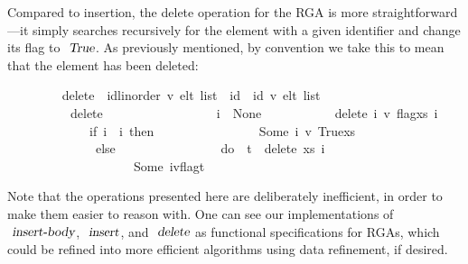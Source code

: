 \documentclass[acmlarge,review,anonymous]{acmart}\settopmatter{printfolios=true}
\begin{document}
Compared to insertion, the delete operation for the RGA is more straightforward---it simply searches recursively for the element with a given identifier and change its flag to $\isa{True}$.
As previously mentioned, by convention we take this to mean that the element has been deleted:
\\
\begin{isabellebody}
\ \ \ \ \ \ \ \  delete\ {\isacharcolon}{\isacharcolon}\ {\isachardoublequoteopen}{\isacharparenleft}{\isacharprime}id{\isacharcolon}{\isacharcolon}{\isacharbraceleft}linorder{\isacharbraceright}{\isacharcomma}\ {\isacharprime}v{\isacharparenright}\ elt\ list\ {\isasymRightarrow}\ {\isacharprime}id\ {\isasymrightharpoonup}\ {\isacharparenleft}{\isacharprime}id{\isacharcomma}\ {\isacharprime}v{\isacharparenright}\ elt\ list{\isachardoublequoteclose}\ \isanewline
\ \ \ \ \ \ \ \ \ \ {\isachardoublequoteopen}delete\ {\isacharbrackleft}{\isacharbrackright}\ \ \ \ \ \ \ \ \ \ \ \ \ \ \ \ \ i\ {\isacharequal}\ None{\isachardoublequoteclose}\ {\isacharbar}\isanewline
\ \ \ \ \ \ \ \ \ \ {\isachardoublequoteopen}delete\ {\isacharparenleft}{\isacharparenleft}i{\isacharprime}{\isacharcomma}\ v{\isacharcomma}\ flag{\isacharparenright}{\isacharhash}xs{\isacharparenright}\ i\ {\isacharequal}\ \isanewline
\ \ \ \ \ \ \ \ \ \ \ \ \ {\isacharparenleft}if\ i{\isacharprime}\ {\isacharequal}\ i\ then\isanewline
\ \ \ \ \ \ \ \ \ \ \ \ \ \ \ \ Some\ {\isacharparenleft}{\isacharparenleft}i{\isacharprime}{\isacharcomma}\ v{\isacharcomma}\ True{\isacharparenright}{\isacharhash}xs{\isacharparenright}\isanewline
\ \ \ \ \ \ \ \ \ \ \ \ \ \ else\isanewline
\ \ \ \ \ \ \ \ \ \ \ \ \ \ \ \ do\ {\isacharbraceleft}\ t\ {\isasymleftarrow}\ delete\ xs\ i\isanewline
\ \ \ \ \ \ \ \ \ \ \ \ \ \ \ \ \ \ \ {\isacharsemicolon}\ Some\ {\isacharparenleft}{\isacharparenleft}i{\isacharprime}{\isacharcomma}v{\isacharcomma}flag{\isacharparenright}{\isacharhash}t{\isacharparenright}\isanewline
\ \ \ \ \ \ \ \ \ \ \ \ \ \ \ \ \ \ \ {\isacharbraceright}{\isacharparenright}{\isachardoublequoteclose}%
\end{isabellebody}
\vspace{\baselineskip}
Note that the operations presented here are deliberately inefficient, in order to make them easier to reason with.
One can see our implementations of $\isa{insert-body}$, $\isa{insert}$, and $\isa{delete}$ as functional specifications for RGAs, which could be refined into more efficient algorithms using data refinement, if desired.
\end{document}
